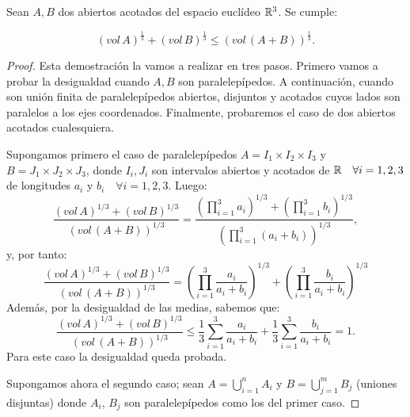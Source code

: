 \begin{theorem}
Sean $A, B$ dos abiertos acotados del espacio euclídeo $\mathbb{R}^3$. Se cumple:

\begin{equation*}
    (vol \, A)^{\frac{1}{3}} + (vol \, B)^{\frac{1}{3}} \leq (vol \, (A+B))^{\frac{1}{3}}.
\end{equation*}
\end{theorem}
\begin{proof}
Esta demostración la vamos a realizar en tres pasos. Primero vamos a probar la desigualdad cuando $A,B$ son paralelepípedos. A continuación, cuando son unión finita de paralelepípedos abiertos, disjuntos y acotados cuyos lados son paralelos a los ejes coordenados. Finalmente, probaremos el caso de dos abiertos acotados cualesquiera.

Supongamos primero el caso de paralelepípedos $A = I_1 \times I_2 \times I_3$ y $B = J_1 \times J_2 \times J_3$, donde $I_i,J_i$ son intervalos abiertos y acotados de $\mathbb{R} \quad \forall i=1,2,3$ de longitudes $a_i$ y $b_i \quad \forall i=1,2,3$. Luego:
%
\begin{equation*}
    \frac{ \left(vol \, A \right)^{1/3} + \left(vol \, B \right)^{1/3}}{\left(vol \, (A+B) \right)^{1/3}} = \frac{\left(\displaystyle\prod_{i=1}^3 a_i \right)^{1/3} + \left(\displaystyle\prod_{i=1}^3 b_i \right)^{1/3}}{\left(\displaystyle\prod_{i=1}^3 (a_i+b_i) \right)^{1/3}},
\end{equation*}
%
y, por tanto:
%
\begin{equation*}
    \frac{ \left(vol \, A \right)^{1/3} + \left(vol \, B \right)^{1/3}}{\left(vol \, (A+B) \right)^{1/3}} = \left(\displaystyle\prod_{i=1}^3 \frac{a_i}{a_i+b_i} \right)^{1/3} + \left(\displaystyle\prod_{i=1}^3 \frac{b_i}{a_i+b_i} \right)^{1/3}
\end{equation*}
%
Además, por la desigualdad de las medias, sabemos que:
%
\begin{equation*}
    \frac{ \left(vol \, A \right)^{1/3} + \left(vol \, B \right)^{1/3}}{\left(vol \, (A+B) \right)^{1/3}} \leq
    \frac{1}{3} \displaystyle\sum_{i=1}^3 \frac{a_i}{a_i+b_i} + \frac{1}{3} \displaystyle\sum_{i=1}^3 \frac{b_i}{a_i+b_i} = 1.
\end{equation*}
%
Para este caso la desigualdad queda probada.

Supongamos ahora el segundo caso; sean $A = \displaystyle\bigcup_{i=1}^n A_i$ y $B = \displaystyle\bigcup_{j=1}^m B_j$ (uniones disjuntas) donde $A_i$, $B_j$ son paralelepípedos como los del primer caso.


\end{proof}
